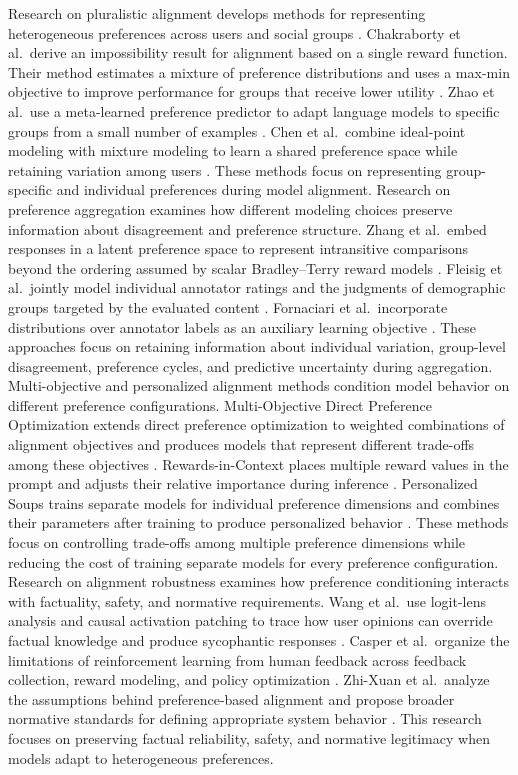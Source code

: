 \documentclass[pdflatex,sn-mathphys-num]{sn-jnl}%
\theoremstyle{thmstyleone}%
\theoremstyle{thmstyletwo}%
\theoremstyle{thmstylethree}%
\begin{document}
Research on pluralistic alignment develops methods for representing heterogeneous preferences across users and social groups \cite{sorensen2024roadmap}. Chakraborty et al.\ derive an impossibility result for alignment based on a single reward function. Their method estimates a mixture of preference distributions and uses a max-min objective to improve performance for groups that receive lower utility \cite{chakraborty2024maxmin}. Zhao et al.\ use a meta-learned preference predictor to adapt language models to specific groups from a small number of examples \cite{zhao2023group}. Chen et al.\ combine ideal-point modeling with mixture modeling to learn a shared preference space while retaining variation among users \cite{chen2024pal}. These methods focus on representing group-specific and individual preferences during model alignment.
Research on preference aggregation examines how different modeling choices preserve information about disagreement and preference structure. Zhang et al.\ embed responses in a latent preference space to represent intransitive comparisons beyond the ordering assumed by scalar Bradley--Terry reward models \cite{zhang2024general}. Fleisig et al.\ jointly model individual annotator ratings and the judgments of demographic groups targeted by the evaluated content \cite{fleisig2023when}. Fornaciari et al.\ incorporate distributions over annotator labels as an auxiliary learning objective \cite{fornaciari2021beyond}. These approaches focus on retaining information about individual variation, group-level disagreement, preference cycles, and predictive uncertainty during aggregation.
Multi-objective and personalized alignment methods condition model behavior on different preference configurations. Multi-Objective Direct Preference Optimization extends direct preference optimization to weighted combinations of alignment objectives and produces models that represent different trade-offs among these objectives \cite{zhou2023beyond}. Rewards-in-Context places multiple reward values in the prompt and adjusts their relative importance during inference \cite{yang2024rewards}. Personalized Soups trains separate models for individual preference dimensions and combines their parameters after training to produce personalized behavior \cite{jang2023personalized}. These methods focus on controlling trade-offs among multiple preference dimensions while reducing the cost of training separate models for every preference configuration.
Research on alignment robustness examines how preference conditioning interacts with factuality, safety, and normative requirements. Wang et al.\ use logit-lens analysis and causal activation patching to trace how user opinions can override factual knowledge and produce sycophantic responses \cite{wang2025when}. Casper et al.\ organize the limitations of reinforcement learning from human feedback across feedback collection, reward modeling, and policy optimization \cite{casper2023open}. Zhi-Xuan et al.\ analyze the assumptions behind preference-based alignment and propose broader normative standards for defining appropriate system behavior \cite{zhixuan2024beyond}. This research focuses on preserving factual reliability, safety, and normative legitimacy when models adapt to heterogeneous preferences.
\end{document}
